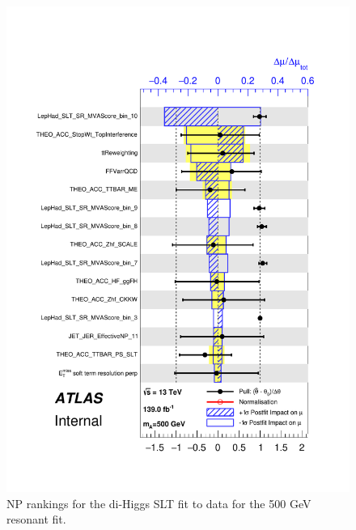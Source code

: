    \begin{figure}
   \centering
   \includegraphics[width=.8\textwidth]{figures/results/HH/LepHad/pulls_SigXsecOverSM_500_SLT.pdf}
   \caption{NP rankings for the di-Higgs \lephad SLT fit to data for the 500 GeV resonant fit.}
   \label{fig:LepHadPostfitNPRankings2HDM500SLT}
   \end{figure}
   
